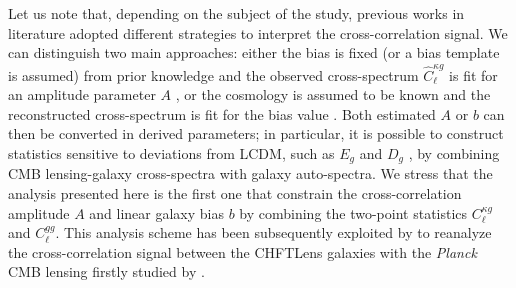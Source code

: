 Let us note that, depending on the subject of the study, previous works in literature adopted different strategies to interpret the cross-correlation signal. We can distinguish two main approaches: either the bias is fixed (or a bias template is assumed) from prior knowledge and the observed cross-spectrum $\hat{C}_{\ell}^{\kappa g}$ is fit for an amplitude parameter $A$ \citep{Sherwin2012,Ade2014c,Allison2015a,Giannantonio2016a}, or the cosmology is assumed to be known and the reconstructed cross-spectrum is fit for the bias value \citep{Feng2012,Bleem2012,Geach2013,DiPompeo2014,Omori2015}. Both estimated $A$ or $b$ can then be converted in derived parameters; in particular, it is possible to construct statistics sensitive to deviations from \gls{LCDM}, such as $E_g$ \citep{Pullen2016} and $D_g$ \citep{Giannantonio2016a}, by combining \gls{CMB} lensing-galaxy cross-spectra with galaxy auto-spectra. We stress that the analysis presented here is the first one that constrain the cross-correlation amplitude $A$ and linear galaxy bias $b$ by combining the two-point statistics $C_{\ell}^{\kappa g}$ and $C_{\ell}^{gg}$. This analysis scheme has been subsequently exploited by \cite{Kuntz2015} to reanalyze the cross-correlation signal between the CHFTLens galaxies with the \emph{Planck} \gls{CMB} lensing firstly studied by \cite{Omori2015}.
 
